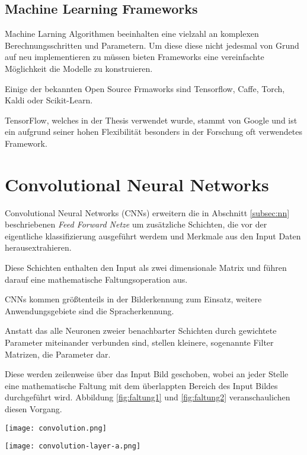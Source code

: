 \subsection{Machine Learning Frameworks}

Machine Larning Algorithmen beeinhalten eine vielzahl an komplexen
Berechnungsschritten und Parametern. Um diese diese nicht jedesmal 
von Grund auf neu implementieren zu müssen bieten 
Frameworks eine vereinfachte Möglichkeit die Modelle zu konstruieren.

Einige der bekannten Open Source Frmaworks sind Tensorflow,
Caffe, Torch, Kaldi oder Scikit-Learn.

TensorFlow, welches in der Thesis verwendet wurde, stammt von 
Google und ist ein aufgrund seiner hohen Flexibilität besonders 
in der Forschung oft verwendetes Framework.





\section{Convolutional Neural Networks}\label{subsec:cnn}

Convolutional Neural Networks (CNNs) erweitern 
die in Abschnitt \ref{subsec:nn} beschriebenen
\textit{Feed Forward Netze} um zusätzliche Schichten,
die vor der eigentliche klassifizierung ausgeführt werdem
und Merkmale aus den Input Daten herausextrahieren.

Diese Schichten enthalten den Input als zwei 
dimensionale Matrix und führen darauf eine 
mathematische Faltungsoperation aus.

CNNs kommen größtenteils in der Bilderkennung zum 
Einsatz, weitere Anwendungsgebiete sind 
die Spracherkennung.

Anstatt das alle Neuronen zweier benachbarter Schichten 
durch gewichtete Parameter miteinander verbunden sind, 
stellen kleinere, sogenannte Filter Matrizen, die 
Parameter dar.

Diese werden zeilenweise über das Input Bild 
geschoben, wobei an jeder Stelle eine mathematische 
Faltung mit dem überlappten Bereich des Input 
Bildes durchgeführt wird. Abbildung \ref{fig:faltung1}
und \ref{fig:faltung2} veranschaulichen diesen Vorgang.


\vspace{1cm}
\begin{minipage}{0.5\textwidth}
    \label{fig:faltung1}
    \centering
    \texttt{[image: convolution.png]}
\end{minipage}
\begin{minipage}{0.5\textwidth}
    \label{fig:faltung2}
    \centering
    \texttt{[image: convolution-layer-a.png]}
\end{minipage}
\vspace{1cm}

